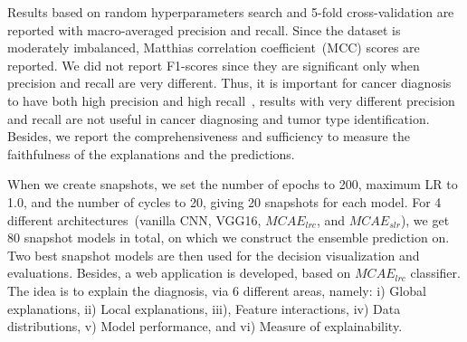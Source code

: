 \hspace*{3.5mm} Results based on random hyperparameters search and 5-fold cross-validation are reported with macro-averaged precision and recall. Since the dataset is moderately imbalanced, Matthias correlation coefficient~(MCC) scores are reported. We did not report F1-scores since they are significant only when precision and recall are very different. Thus, it is important for cancer diagnosis to have both high precision and high recall~\cite{naulaerts2017precision}, results with very different precision and recall are not useful in cancer diagnosing and tumor type identification. Besides, we report the comprehensiveness and sufficiency to measure the faithfulness of the explanations and the predictions. 

\hspace*{3.5mm} When we create snapshots, we set the number of epochs to 200, maximum LR to 1.0, and the number of cycles to 20, giving 20 snapshots for each model. For 4 different architectures~(vanilla CNN, VGG16, $MCAE_{lrc}$, and $MCAE_{slr}$), we get 80 snapshot models in total, on which we construct the ensemble prediction on. Two best snapshot models are then used for the decision visualization and evaluations. Besides, a web application is developed, based on $MCAE_{lrc}$ classifier. The idea is to explain the diagnosis, via 6 different areas, namely: i) Global explanations, ii) Local explanations, iii), Feature interactions, iv) Data distributions, v) Model performance, and vi) Measure of explainability. %

